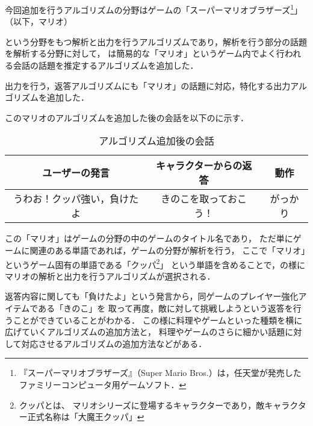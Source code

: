 今回追加を行うアルゴリズムの分野はゲームの「スーパーマリオブラザーズ\footnote{『スーパーマリオブラザーズ』（Super Mario Bros.）は，任天堂が発売したファミリーコンピュータ用ゲームソフト．}」（以下，マリオ）

という分野をもつ解析と出力を行うアルゴリズムであり，解析を行う部分の話題を解析する分野に対して，
は簡易的な「マリオ」というゲーム内でよく行われる会話の話題を推定するアルゴリズムを追加した．

出力を行う，返答アルゴリズムにも「マリオ」の話題に対応，特化する出力アルゴリズムを追加した．

このマリオのアルゴリズムを追加した後の会話を以下のに示す．

\begin{table}[tbh]
	\caption{アルゴリズム追加後の会話} \label{tab:afterChat}
	\begin{center}
		\begin{tabular}[htb]{c|c|c}
		\hline
		ユーザーの発言 & キャラクターからの返答 & 動作 \\
		\hline
		うわお！クッパ強い，負けたよ & きのこを取っておこう！ & がっかり \\
		\hline
		\end{tabular}
	\end{center}
\end{table}

この「マリオ」はゲームの分野の中のゲームのタイトル名であり，
ただ単にゲームに関連のある単語であれば，ゲームの分野が解析を行う，
ここで「マリオ」というゲーム固有の単語である「クッパ\footnote{クッパとは、
マリオシリーズに登場するキャラクターであり，敵キャラクター正式名称は「大魔王クッパ」}」
という単語を含めることで，の様に
マリオの解析と出力を行うアルゴリズムが選択される．

返答内容に関しても「負けたよ」という発言から，同ゲームのプレイヤー強化アイテムである「きのこ」を
取って再度，敵に対して挑戦しようという返答を行うことができていることがわかる．
この様に料理やゲームといった種類を横に広げていくアルゴリズムの追加方法と，
料理やゲームのさらに細かい話題に対して対応させるアルゴリズムの追加方法などがある．

